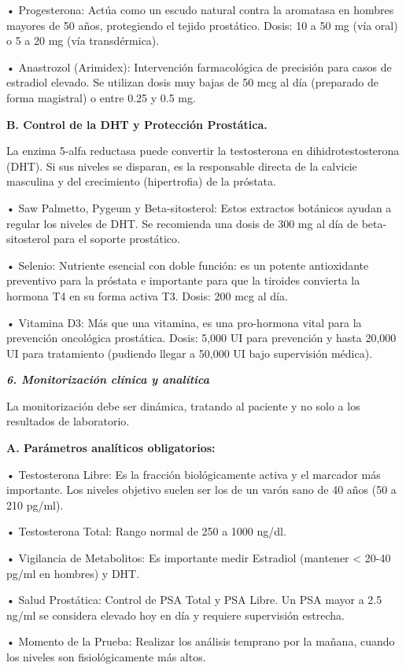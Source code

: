\documentclass[
  spanish,
]{article}
\begin{document}
• Progesterona: Actúa como un escudo natural contra la aromatasa en hombres mayores de 50 años, protegiendo el tejido prostático. Dosis: 10 a 50 mg (vía oral) o 5 a 20 mg (vía transdérmica).

• Anastrozol (Arimidex): Intervención farmacológica de precisión para casos de estradiol elevado. Se utilizan dosis muy bajas de 50 mcg al día (preparado de forma magistral) o entre 0.25 y 0.5 mg.

\textbf{B. Control de la DHT y Protección Prostática.}

La enzima 5-alfa reductasa puede convertir la testosterona en dihidrotestosterona (DHT). Si sus niveles se disparan, es la responsable directa de la calvicie masculina y del crecimiento (hipertrofia) de la próstata.

• Saw Palmetto, Pygeum y Beta-sitosterol: Estos extractos botánicos ayudan a regular los niveles de DHT. Se recomienda una dosis de 300 mg al día de beta-sitosterol para el soporte prostático.

• Selenio: Nutriente esencial con doble función: es un potente antioxidante preventivo para la próstata e importante para que la tiroides convierta la hormona T4 en su forma activa T3. Dosis: 200 mcg al día.

• Vitamina D3: Más que una vitamina, es una pro-hormona vital para la prevención oncológica prostática. Dosis: 5,000 UI para prevención y hasta 20,000 UI para tratamiento (pudiendo llegar a 50,000 UI bajo supervisión médica).

\textbf{\emph{6. Monitorización clínica y analítica}}

La monitorización debe ser dinámica, tratando al paciente y no solo a los resultados de laboratorio.

\textbf{A. Parámetros analíticos obligatorios:}

• Testosterona Libre: Es la fracción biológicamente activa y el marcador más importante. Los niveles objetivo suelen ser los de un varón sano de 40 años (50 a 210 pg/ml).

• Testosterona Total: Rango normal de 250 a 1000 ng/dl.

• Vigilancia de Metabolitos: Es importante medir Estradiol (mantener \textless{} 20-40 pg/ml en hombres) y DHT.

• Salud Prostática: Control de PSA Total y PSA Libre. Un PSA mayor a 2.5 ng/ml se considera elevado hoy en día y requiere supervisión estrecha.

• Momento de la Prueba: Realizar los análisis temprano por la mañana, cuando los niveles son fisiológicamente más altos.
\end{document}

